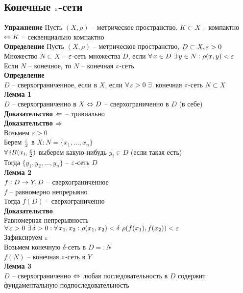 \documentclass[12pt]{article}
\begin{document}
\subsection{Конечные $\varepsilon$-сети}
\textbf{Упражнение}
Пусть $(X, \rho)$ -- метрическое пространство, $K \subset X$ -- компактно $\Leftrightarrow K$ -- секвенциально компактно\\
\textbf{Определение}
Пусть $(X, \rho)$ -- метрическое пространство, $D \subset X, \varepsilon > 0$\\
Множество $N \subset X$ -- $\varepsilon$-сеть множества $D$, если $\forall\, x \in D \ \exists\, y \in N: \rho(x, y) < \varepsilon$\\
Если $N$ -- конечное, то $N$ -- конечная $\varepsilon$-сеть\\
\textbf{Определение}\\
$D$ -- сверхограниченное, если в $X$, если $\forall\, \varepsilon > 0 \ \exists\,$ конечная $\varepsilon$-сеть $N \subset X$\\
\textbf{Лемма 1}\\
$D$ -- сверхограниченно в $X \Leftrightarrow D$ -- сверхограниченно в $D$ (в себе)\\
\textbf{Доказательство $\Leftarrow$} -- тривиально\\
\textbf{Доказательство $\Rightarrow$}\\
Возьмем $\varepsilon > 0$\\
Берем $\frac{\varepsilon}2$ в $X: N = \{ x_1, \ldots, x_n\}$\\
$\forall\, i B(x_i, \frac{\varepsilon}2)$ выберем какую-нибудь $y_i \in D$ (если такая есть)\\
Тогда $\{ y_1, y_2, \ldots, y_n\}$ -- $\varepsilon$-сеть $D$\\
\textbf{Лемма 2}\\
$f: D \rightarrow Y, D$ -- сверхограниченное\\
$f$ -- равномерно непрерывно\\
Тогда $f(D)$ -- сверхограниченно\\
\textbf{Доказательство}\\
Равномерная непрерывность $\fall \eps > 0\ \ex \delta > 0: \fall x_1, x_2: \rho(x_1, x_2) < \delta\ \rho(f(x_1), f(x_2)) < \eps$\\
Зафиксируем $\varepsilon$\\
Возьмем конечную $\delta$-сеть в $D =: N$\\
$f(N)$ -- конечная $\varepsilon$-сеть в $Y$\\
\textbf{Лемма 3}\\
$D$ -- сверхограниченно $\Leftrightarrow$ любая последовательность в $D$ содержит фундаментальную подпоследовательность\\
\end{document}
